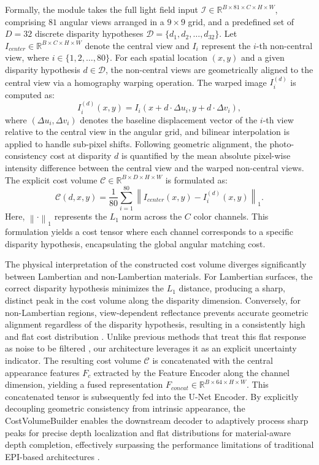 \documentclass[lettersize,journal]{IEEEtran}
\begin{document}
Formally, the module takes the full light field input $\mathcal{I} \in \mathbb{R}^{B \times 81 \times C \times H \times W}$, comprising $81$ angular views arranged in a $9 \times 9$ grid, and a predefined set of $D=32$ discrete disparity hypotheses $\mathcal{D} = \{d_1, d_2, \dots, d_{32}\}$. Let $I_{center} \in \mathbb{R}^{B \times C \times H \times W}$ denote the central view and $I_i$ represent the $i$-th non-central view, where $i \in \{1, 2, \dots, 80\}$. For each spatial location $(x, y)$ and a given disparity hypothesis $d \in \mathcal{D}$, the non-central views are geometrically aligned to the central view via a homography warping operation. The warped image $I_i^{(d)}$ is computed as:
\begin{equation}
I_i^{(d)}(x, y) = I_i \left( x + d \cdot \Delta u_i, y + d \cdot \Delta v_i \right),
\end{equation}
where $(\Delta u_i, \Delta v_i)$ denotes the baseline displacement vector of the $i$-th view relative to the central view in the angular grid, and bilinear interpolation is applied to handle sub-pixel shifts. Following geometric alignment, the photo-consistency cost at disparity $d$ is quantified by the mean absolute pixel-wise intensity difference between the central view and the warped non-central views. The explicit cost volume $\mathcal{C} \in \mathbb{R}^{B \times D \times H \times W}$ is formulated as:
\begin{equation}
\mathcal{C}(d, x, y) = \frac{1}{80} \sum_{i=1}^{80} \left\| I_{center}(x, y) - I_i^{(d)}(x, y) \right\|_1.
\end{equation}
Here, $\left\| \cdot \right\|_1$ represents the $L_1$ norm across the $C$ color channels. This formulation yields a cost tensor where each channel corresponds to a specific disparity hypothesis, encapsulating the global angular matching cost.

The physical interpretation of the constructed cost volume diverges significantly between Lambertian and non-Lambertian materials. For Lambertian surfaces, the correct disparity hypothesis minimizes the $L_1$ distance, producing a sharp, distinct peak in the cost volume along the disparity dimension. Conversely, for non-Lambertian regions, view-dependent reflectance prevents accurate geometric alignment regardless of the disparity hypothesis, resulting in a consistently high and flat cost distribution \cite{li2021}. Unlike previous methods that treat this flat response as noise to be filtered \cite{chen2017}, our architecture leverages it as an explicit uncertainty indicator. The resulting cost volume $\mathcal{C}$ is concatenated with the central appearance features $F_c$ extracted by the Feature Encoder along the channel dimension, yielding a fused representation $F_{concat} \in \mathbb{R}^{B \times 64 \times H \times W}$. This concatenated tensor is subsequently fed into the U-Net Encoder. By explicitly decoupling geometric consistency from intrinsic appearance, the CostVolumeBuilder enables the downstream decoder to adaptively process sharp peaks for precise depth localization and flat distributions for material-aware depth completion, effectively surpassing the performance limitations of traditional EPI-based architectures \cite{zhang2023}.
\end{document}
